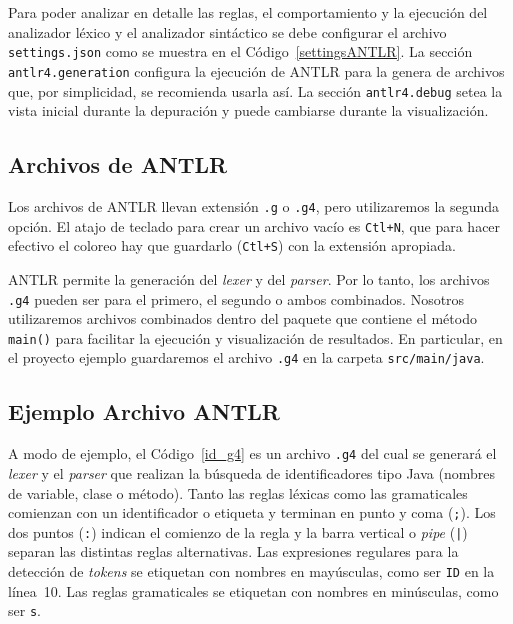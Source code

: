Para poder analizar en detalle las reglas, el comportamiento y la ejecución del analizador léxico y el analizador sintáctico se debe configurar el archivo \verb|settings.json| como se muestra en el Código~\ref{settingsANTLR}.  La sección \verb|antlr4.generation| configura la ejecución de ANTLR para la genera de archivos que, por simplicidad, se recomienda usarla así.  La sección \verb|antlr4.debug| setea la vista inicial durante la depuración y puede cambiarse durante la visualización.



\subsection{Archivos de ANTLR}
\label{archivo_antlr}

Los archivos de ANTLR llevan extensión \verb|.g| o \verb|.g4|, pero utilizaremos la segunda opción.  El atajo de teclado para crear un archivo vacío es \verb|Ctl+N|, que para hacer efectivo el coloreo hay que guardarlo (\verb|Ctl+S|) con la extensión apropiada.

ANTLR permite la generación del \emph{lexer} y del \emph{parser}.  Por lo tanto, los archivos \verb|.g4| pueden ser para el primero, el segundo o ambos combinados.  Nosotros utilizaremos archivos combinados dentro del paquete que contiene el método \verb|main()| para facilitar la ejecución y visualización de resultados.  En particular, en el proyecto ejemplo guardaremos el archivo \verb|.g4| en la carpeta \verb|src/main/java|.


\subsection{Ejemplo Archivo ANTLR}
\label{ejemplo_archivo_antlr}

A modo de ejemplo, el Código~\ref{id_g4} es un archivo \verb|.g4| del cual se generará el \emph{lexer} y el \emph{parser} que realizan la búsqueda de identificadores tipo Java (nombres de variable, clase o método).  Tanto las reglas léxicas como las gramaticales comienzan con un identificador o etiqueta y terminan en punto y coma (\verb|;|).  Los dos puntos (\verb|:|) indican el comienzo de la regla y la barra vertical o \emph{pipe} (\verb-|-) separan las distintas reglas alternativas.  Las expresiones regulares para la detección de \emph{tokens} se etiquetan con nombres en mayúsculas, como ser \verb|ID| en la línea~10.  Las reglas gramaticales se etiquetan con nombres en minúsculas, como ser \verb|s|.


